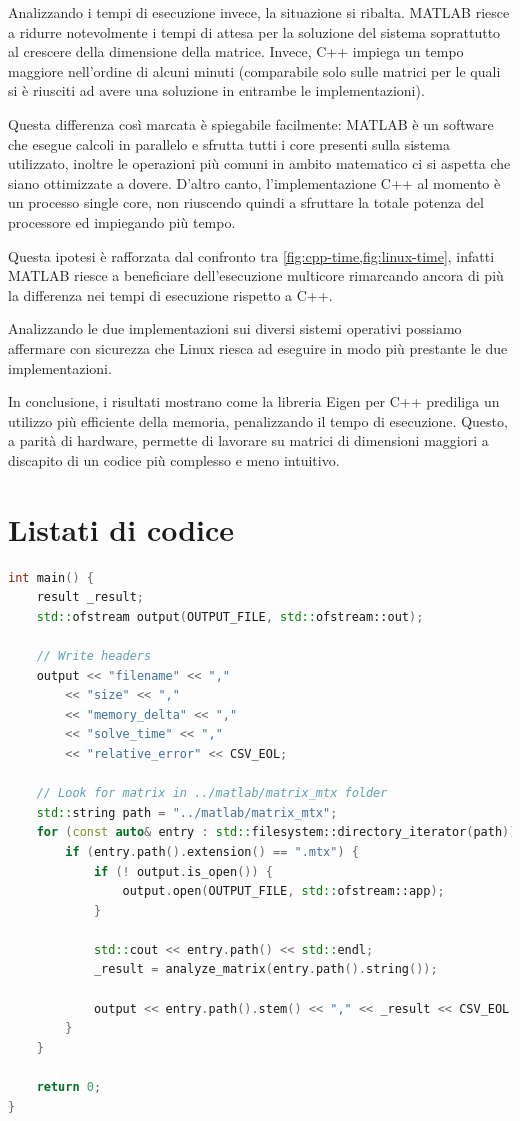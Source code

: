 \documentclass[11pt,italian]{article}
\begin{document}
\smallskip
Analizzando i tempi di esecuzione invece, la situazione si ribalta. MATLAB riesce a ridurre notevolmente i tempi di attesa per la soluzione del sistema soprattutto al crescere della dimensione della matrice.
Invece, C++ impiega un tempo maggiore nell'ordine di alcuni minuti (comparabile solo sulle matrici per le quali si è riusciti ad avere una soluzione in entrambe le implementazioni).

Questa differenza così marcata è spiegabile facilmente: MATLAB è un software che esegue calcoli in parallelo e sfrutta tutti i core presenti sulla sistema utilizzato, inoltre le operazioni più comuni in ambito matematico ci si aspetta che siano ottimizzate a dovere.
D'altro canto, l'implementazione C++ al momento è un processo single core, non riuscendo quindi a sfruttare la totale potenza del processore ed impiegando più tempo.

Questa ipotesi è rafforzata dal confronto tra \cref{fig:cpp-time,fig:linux-time}, infatti MATLAB riesce a beneficiare dell'esecuzione multicore rimarcando ancora di più la differenza nei tempi di esecuzione rispetto a C++.

\smallskip
Analizzando le due implementazioni sui diversi sistemi operativi possiamo affermare con sicurezza che Linux riesca ad eseguire in modo più prestante le due implementazioni.

\smallskip
In conclusione, i risultati mostrano come la libreria Eigen per C++ prediliga un utilizzo più efficiente della memoria, penalizzando il tempo di esecuzione. Questo, a parità di hardware, permette di lavorare su matrici di dimensioni maggiori a discapito di un codice più complesso e meno intuitivo.

\newpage
\section{Listati di codice}
\label{section:code}
\begin{lstlisting}[language=C++,emph={std},basicstyle=\footnotesize\ttfamily,caption=Main dell'implementazione C++]
int main() {
    result _result;
    std::ofstream output(OUTPUT_FILE, std::ofstream::out);

    // Write headers
    output << "filename" << ","
        << "size" << ","
        << "memory_delta" << ","
        << "solve_time" << ","
        << "relative_error" << CSV_EOL;

    // Look for matrix in ../matlab/matrix_mtx folder
    std::string path = "../matlab/matrix_mtx";
    for (const auto& entry : std::filesystem::directory_iterator(path)) {
        if (entry.path().extension() == ".mtx") {
            if (! output.is_open()) {
                output.open(OUTPUT_FILE, std::ofstream::app);
            }

            std::cout << entry.path() << std::endl;
            _result = analyze_matrix(entry.path().string());

            output << entry.path().stem() << "," << _result << CSV_EOL;            output.close();
        }
    }

    return 0;
}
\end{lstlisting}
\end{document}
